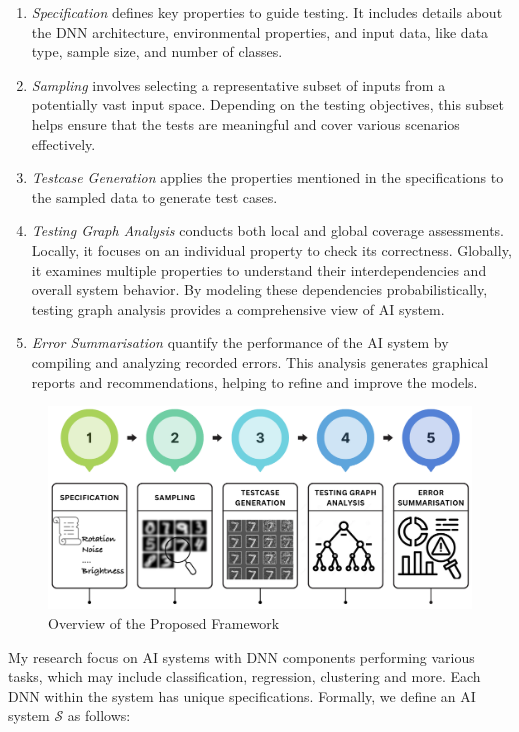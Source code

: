 \begin{enumerate}
  \item \emph{Specification} defines key properties to guide testing. It includes details about the DNN architecture, environmental properties, and input data, like data type, sample size, and number of classes. 
    \item \emph{Sampling} involves selecting a representative subset of inputs from a potentially vast input space. Depending on the testing objectives, this subset helps ensure that the tests are meaningful and cover various scenarios effectively.
    \item \emph{Testcase Generation} applies the properties mentioned in the specifications to the sampled data to generate test cases.
    \item \emph{Testing Graph Analysis} conducts both local and global coverage assessments. Locally, it focuses on an individual property to check its correctness. Globally, it examines multiple properties to understand their interdependencies and overall system behavior. By modeling these dependencies probabilistically, testing graph analysis provides a comprehensive view of AI system.
    \item \emph{Error Summarisation} quantify the performance of the AI system by compiling and analyzing recorded errors. This analysis generates graphical reports and recommendations, helping to refine and improve the models.
\end{enumerate}

\begin{figure}
  \centering
  \includegraphics[width=\linewidth]{figures/fivesteps.png}
  \caption{Overview of the Proposed Framework}
  \label{fig:framework}
\end{figure}

My research focus on AI systems with DNN components performing various tasks, which may include classification, regression, clustering and more. Each DNN within the system has unique specifications. Formally, we define an AI system $ \mathcal{S} $ as follows:

